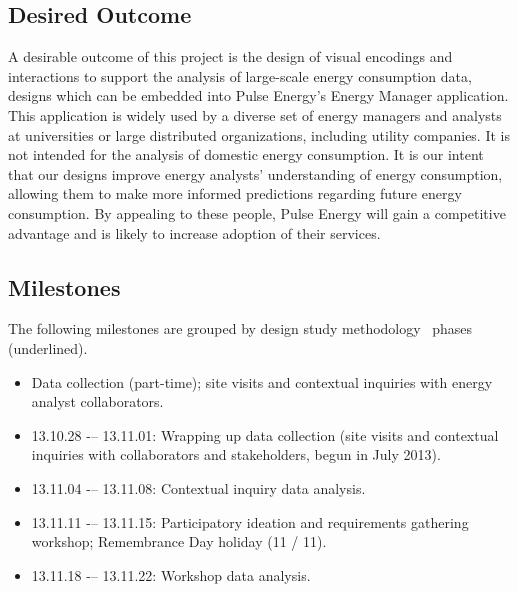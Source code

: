 \subsection{Desired Outcome}
\label{app:emu:proposal-outcome}

A desirable outcome of this project is the design of visual encodings and interactions to support the analysis of large-scale energy consumption data, designs which can be embedded into Pulse Energy's Energy Manager application. 
This application is widely used by a diverse set of energy managers and analysts at universities or large distributed organizations, including utility companies. 
It is not intended for the analysis of domestic energy consumption. 
It is our intent that our designs improve energy analysts' understanding of energy consumption, allowing them to make more informed predictions regarding future energy consumption. 
By appealing to these people, Pulse Energy will gain a competitive advantage and is likely to increase adoption of their services.

\subsection{Milestones}
\label{app:emu:proposal-milestones}

The following milestones are grouped by design study methodology~\cite{Sedlmair2012} phases (underlined).


\begin{itemize}
    \item Data collection (part-time); site visits and contextual inquiries with energy analyst collaborators.
\end{itemize}


\begin{itemize}
    \item 13.10.28 -– 13.11.01: Wrapping up data collection (site visits and contextual inquiries with collaborators and stakeholders, begun in July 2013).
    \item 13.11.04 -– 13.11.08: Contextual inquiry data analysis.
    \item 13.11.11 -– 13.11.15: Participatory ideation and requirements gathering workshop; Remembrance Day holiday (11 / 11).
    \item 13.11.18 -– 13.11.22: Workshop data analysis.
\end{itemize}

